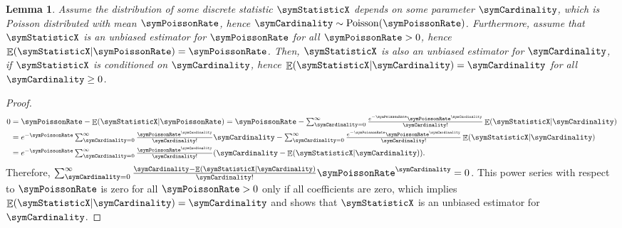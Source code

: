 \documentclass[sigconf, nonacm]{acmart}
\newtheorem{lemma}{Lemma}
\DeclareMathOperator*{\symPoisson}{Poisson}
\DeclareMathOperator*{\symExpectation}{\mathbb{E}}
\begin{document}
\begin{lemma}
\label{lem:depoissonization}
Assume the distribution of some discrete statistic $\symStatisticX$ depends on some parameter $\symCardinality$, which is Poisson distributed with mean $\symPoissonRate$, hence $\symCardinality\sim\symPoisson(\symPoissonRate)$. Furthermore, assume that $\symStatisticX$ is an unbiased estimator for $\symPoissonRate$ for all $\symPoissonRate > 0$, hence $\symExpectation(\symStatisticX\vert \symPoissonRate) = \symPoissonRate$. Then, $\symStatisticX$ is also an unbiased estimator for $\symCardinality$, if $\symStatisticX$ is conditioned on $\symCardinality$, hence $\symExpectation(\symStatisticX\vert \symCardinality) = \symCardinality$ for all $\symCardinality\geq 0$.
\end{lemma}

\begin{proof}
\begin{align*}
\textstyle 0 &= \symPoissonRate - \symExpectation(\symStatisticX\vert \symPoissonRate)
=
\textstyle
\symPoissonRate - \sum_{\symCardinality=0}^\infty \frac{e^{-\symPoissonRate}\symPoissonRate^\symCardinality}{\symCardinality!} \symExpectation(\symStatisticX\vert \symCardinality)
\\
&=
\textstyle  
e^{-\symPoissonRate}\sum_{\symCardinality=0}^\infty \frac{\symPoissonRate^\symCardinality}{\symCardinality!} \symCardinality - \sum_{\symCardinality=0}^\infty \frac{e^{-\symPoissonRate}\symPoissonRate^\symCardinality}{\symCardinality!} \symExpectation(\symStatisticX\vert \symCardinality)
\\
&=
\textstyle
e^{-\symPoissonRate} \sum_{\symCardinality=0}^\infty \frac{\symPoissonRate^\symCardinality}{\symCardinality!} (\symCardinality - \symExpectation(\symStatisticX\vert \symCardinality)).
\end{align*}
Therefore, $\sum_{\symCardinality=0}^\infty \frac{\symCardinality - \symExpectation(\symStatisticX\vert \symCardinality)}{\symCardinality!}\symPoissonRate^\symCardinality  = 0$. This power series with respect to $\symPoissonRate$ is zero for all $\symPoissonRate>0$ only if all coefficients are zero, which implies $\symExpectation(\symStatisticX\vert \symCardinality) = \symCardinality$ and shows that $\symStatisticX$ is an unbiased estimator for $\symCardinality$. 
\end{proof}
\end{document}
